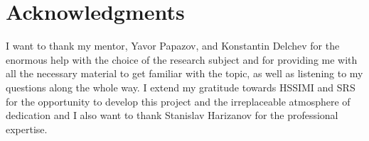 \documentclass[11pt, a4paper]{article}
\theoremstyle{definition}
\begin{document}
\section{Acknowledgments}
I want to thank my mentor, Yavor Papazov, and Konstantin Delchev for the enormous help with the choice of the research subject and for providing me with all the necessary material to get familiar with the topic, as well as listening to my questions along the whole way. I extend my gratitude towards HSSIMI and SRS for the opportunity to develop this project and the irreplaceable atmosphere of dedication and I also want to thank Stanislav Harizanov for the professional expertise.

\nocite{*}

\end{document}
